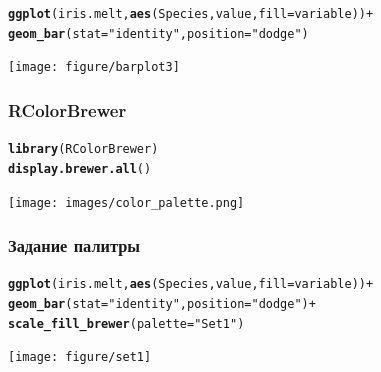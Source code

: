 \documentclass[compress]{beamer}\usepackage[]{graphicx}\usepackage[]{color}
\makeatletter
\newcommand{\hlstr}[1]{\textcolor[rgb]{0.192,0.494,0.8}{#1}}%
\newcommand{\hlopt}[1]{\textcolor[rgb]{0,0,0}{#1}}%
\newcommand{\hlstd}[1]{\textcolor[rgb]{0.345,0.345,0.345}{#1}}%
\newcommand{\hlkwc}[1]{\textcolor[rgb]{0.333,0.667,0.333}{#1}}%
\newcommand{\hlkwd}[1]{\textcolor[rgb]{0.737,0.353,0.396}{\textbf{#1}}}%
\newenvironment{kframe}{%
 \def\at@end@of@kframe{}%
 \ifinner\ifhmode%
  \def\at@end@of@kframe{\end{minipage}}%
  \begin{minipage}{\columnwidth}%
 \fi\fi%
 \def\FrameCommand##1{\hskip\@totalleftmargin \hskip-\fboxsep
 \colorbox{shadecolor}{##1}\hskip-\fboxsep
     \hskip-\linewidth \hskip-\@totalleftmargin \hskip\columnwidth}%
 \MakeFramed {\advance\hsize-\width
   \@totalleftmargin\z@ \linewidth\hsize
   \@setminipage}}%
 {\par\unskip\endMakeFramed%
 \at@end@of@kframe}
\newenvironment{knitrout}{}{} %
\makeatother
\begin{document}
\begin{frame}[fragile]
\begin{knitrout}\footnotesize
{}\color{fgcolor}\begin{kframe}
\begin{alltt}
\hlkwd{ggplot}\hlstd{(iris.melt,} \hlkwd{aes}\hlstd{(Species, value,} \hlkwc{fill} \hlstd{= variable))} \hlopt{+}
  \hlkwd{geom_bar}\hlstd{(}\hlkwc{stat} \hlstd{=} \hlstr{"identity"}\hlstd{,} \hlkwc{position} \hlstd{=} \hlstr{"dodge"}\hlstd{)}
\end{alltt}
\end{kframe}
\texttt{[image: figure/barplot3]} 

\end{knitrout}

\end{frame}

\begin{frame}[fragile]
\frametitle{RColorBrewer}
\begin{knitrout}\footnotesize
{}\color{fgcolor}\begin{kframe}
\begin{alltt}
\hlkwd{library}\hlstd{(RColorBrewer)}
\hlkwd{display.brewer.all}\hlstd{()}
\end{alltt}
\end{kframe}
\end{knitrout}

\texttt{[image: images/color\_palette.png]}
\end{frame}

\begin{frame}[fragile]
\frametitle{Задание палитры}
\begin{knitrout}\footnotesize
{}\color{fgcolor}\begin{kframe}
\begin{alltt}
\hlkwd{ggplot}\hlstd{(iris.melt,} \hlkwd{aes}\hlstd{(Species, value,} \hlkwc{fill} \hlstd{= variable))} \hlopt{+}
  \hlkwd{geom_bar}\hlstd{(}\hlkwc{stat} \hlstd{=} \hlstr{"identity"}\hlstd{,} \hlkwc{position} \hlstd{=} \hlstr{"dodge"}\hlstd{)} \hlopt{+}
  \hlkwd{scale_fill_brewer}\hlstd{(}\hlkwc{palette} \hlstd{=} \hlstr{"Set1"}\hlstd{)}
\end{alltt}
\end{kframe}
\texttt{[image: figure/set1]} 

\end{knitrout}

\end{frame}
\end{document}
